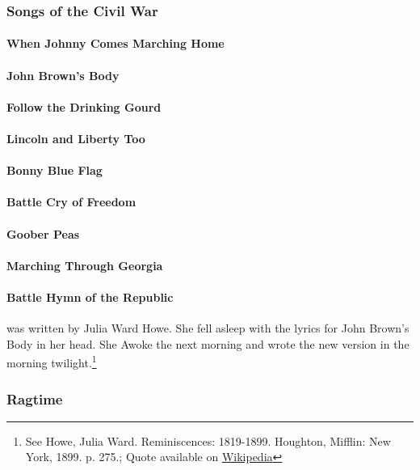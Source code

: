 			\subsubsection{Songs of the Civil War}
			\label{CivilWarSongs}
				\paragraph{When Johnny Comes Marching Home}
				\paragraph{John Brown's Body}
				\paragraph {Follow the Drinking Gourd}
				\paragraph{Lincoln and Liberty Too}
				\paragraph{Bonny Blue Flag}
				\paragraph{Battle Cry of Freedom}
				\paragraph{Goober Peas}
				\paragraph{Marching Through Georgia}
				\paragraph{Battle Hymn of the Republic} was written by Julia Ward Howe.  She fell asleep with the lyrics for John Brown's Body in her head.  She Awoke the next morning and wrote the new version in the morning twilight.\footnote{See Howe, Julia Ward. Reminiscences: 1819-1899. Houghton, Mifflin: New York, 1899. p. 275.; Quote available on \href{https://en.wikipedia.org/wiki/Battle_Hymn_of_the_Republic\#Creation_of_the_"Battle_Hymn"}{Wikipedia}}
				
			\subsubsection{Ragtime}
